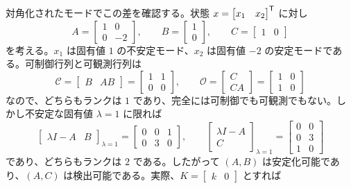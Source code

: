 対角化されたモードでこの差を確認する。状態 $x=\begin{bmatrix}x_1&x_2\end{bmatrix}^{\mathsf{T}}$ に対し
\begin{equation}
  A=\begin{bmatrix}1&0\\0&-2\end{bmatrix},\qquad
  B=\begin{bmatrix}1\\0\end{bmatrix},\qquad
  C=\begin{bmatrix}1&0\end{bmatrix}
  \label{eq:modal-stabilizable-detectable-example}
\end{equation}
を考える。$x_1$ は固有値 $1$ の不安定モード、$x_2$ は固有値 $-2$ の安定モードである。可制御行列と可観測行列は
\begin{equation}
  \mathcal{C}=\begin{bmatrix}B&AB\end{bmatrix}
  =\begin{bmatrix}1&1\\0&0\end{bmatrix},\qquad
  \mathcal{O}=\begin{bmatrix}C\\CA\end{bmatrix}
  =\begin{bmatrix}1&0\\1&0\end{bmatrix}
\end{equation}
なので、どちらもランクは $1$ であり、完全には可制御でも可観測でもない。しかし不安定な固有値 $\lambda=1$ に限れば
\begin{equation}
  \begin{bmatrix}\lambda I-A&B\end{bmatrix}_{\lambda=1}
  =
  \begin{bmatrix}0&0&1\\0&3&0\end{bmatrix},\qquad
  \begin{bmatrix}\lambda I-A\\C\end{bmatrix}_{\lambda=1}
  =
  \begin{bmatrix}0&0\\0&3\\1&0\end{bmatrix}
\end{equation}
であり、どちらもランクは $2$ である。したがって $(A,B)$ は安定化可能であり、$(A,C)$ は検出可能である。実際、$K=\begin{bmatrix}k&0\end{bmatrix}$ とすれば
